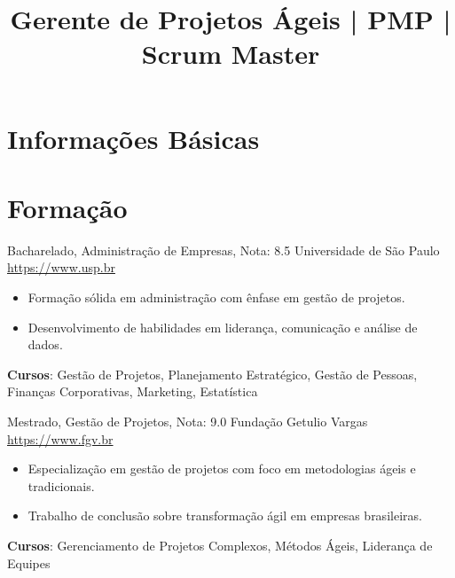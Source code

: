 \documentclass[a4paper, serif, 10pt]{moderncv}
\title{Gerente de Projetos Ágeis | PMP | Scrum Master}
\begin{document}
\maketitle

\section{Informações Básicas}

\section{Formação}

        {Bacharelado, Administração de Empresas, Nota: 8.5}
        {Universidade de São Paulo}
        {\url{https://www.usp.br}}
        {}
        {\begin{itemize}
\item Formação sólida em administração com ênfase em gestão de projetos.
\item Desenvolvimento de habilidades em liderança, comunicação e análise de dados.
\end{itemize}
\textbf{Cursos}: Gestão de Projetos, Planejamento Estratégico, Gestão de Pessoas, Finanças Corporativas, Marketing, Estatística}

        {Mestrado, Gestão de Projetos, Nota: 9.0}
        {Fundação Getulio Vargas}
        {\url{https://www.fgv.br}}
        {}
        {\begin{itemize}
\item Especialização em gestão de projetos com foco em metodologias ágeis e tradicionais.
\item Trabalho de conclusão sobre transformação ágil em empresas brasileiras.
\end{itemize}
\textbf{Cursos}: Gerenciamento de Projetos Complexos, Métodos Ágeis, Liderança de Equipes}
\end{document}
